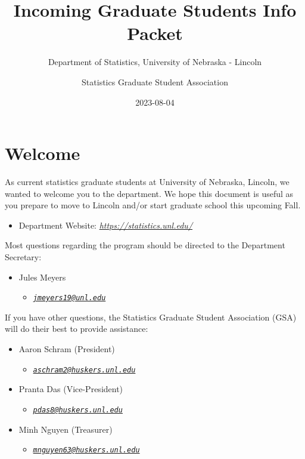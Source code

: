 \documentclass[
  12pt,
]{book}
\title{Incoming Graduate Students Info Packet}
\subtitle{Department of Statistics, University of Nebraska - Lincoln}
\author{Statistics Graduate Student Association}
\date{2023-08-04}
\providecommand{\tightlist}{%
  \setlength{\itemsep}{0pt}\setlength{\parskip}{0pt}}
\begin{document}
\maketitle

{
\setcounter{tocdepth}{1}
\tableofcontents
}
\hypertarget{welcome}{%
\chapter{Welcome}\label{welcome}}

As current statistics graduate students at University of Nebraska, Lincoln, we wanted to welcome you to the department. We hope this document is useful as you prepare to move to Lincoln and/or start graduate school this upcoming Fall.

\begin{itemize}
\tightlist
\item
  Department Website: \emph{\url{https://statistics.unl.edu/}}
\end{itemize}

Most questions regarding the program should be directed to the Department Secretary:

\begin{itemize}
\tightlist
\item
  Jules Meyers

  \begin{itemize}
  \tightlist
  \item
    \emph{\href{mailto:jmeyers19@unl.edu}{\nolinkurl{jmeyers19@unl.edu}}}
  \end{itemize}
\end{itemize}

If you have other questions, the Statistics Graduate Student Association (GSA) will do their best to provide assistance:

\begin{itemize}
\tightlist
\item
  Aaron Schram (President)

  \begin{itemize}
  \tightlist
  \item
    \emph{\href{mailto:aschram2@huskers.unl.edu}{\nolinkurl{aschram2@huskers.unl.edu}}}
  \end{itemize}
\item
  Pranta Das (Vice-President)

  \begin{itemize}
  \tightlist
  \item
    \emph{\href{mailto:pdas8@huskers.unl.edu}{\nolinkurl{pdas8@huskers.unl.edu}}}
  \end{itemize}
\item
  Minh Nguyen (Treasurer)

  \begin{itemize}
  \tightlist
  \item
    \emph{\href{mailto:mnguyen63@huskers.unl.edu}{\nolinkurl{mnguyen63@huskers.unl.edu}}}
  \end{itemize}
\end{itemize}
\end{document}
